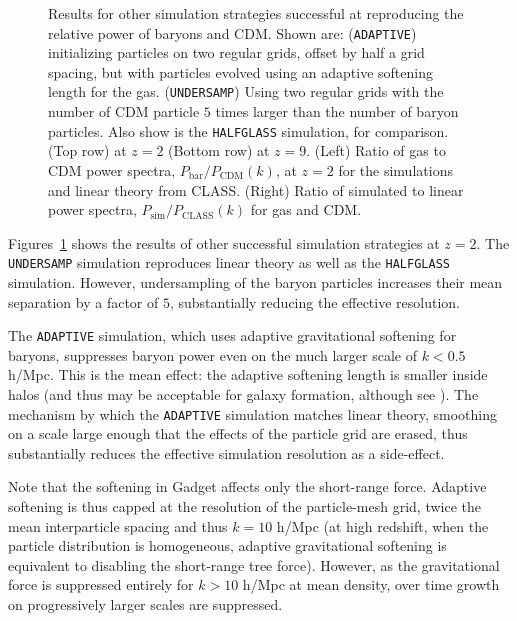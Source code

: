 \documentclass[a4paper,11pt]{article}
\begin{document}
\begin{figure}
\caption{Results for other simulation strategies successful at reproducing the relative power of baryons and CDM. Shown are: (\texttt{ADAPTIVE}) initializing particles on two regular grids, offset by half a grid spacing, but with particles evolved using an adaptive softening length for the gas. (\texttt{UNDERSAMP}) Using two regular grids with the number of CDM particle $5$ times larger than the number of baryon particles. Also show is the \texttt{HALFGLASS} simulation, for comparison. (Top row) at $z=2$ (Bottom row) at $z=9$. (Left) Ratio of gas to CDM power spectra, $P_\mathrm{bar}/P_\mathrm{CDM}(k)$, at $z=2$ for the simulations and linear theory from CLASS. (Right) Ratio of simulated to linear power spectra, $P_\mathrm{sim}/P_\mathrm{CLASS}(k)$ for gas and CDM.}
  \label{fig:adaptive}
\end{figure}

Figures~\ref{fig:adaptive} shows the results of other successful simulation strategies at $z=2$. The \texttt{UNDERSAMP} simulation reproduces linear theory as well as the \texttt{HALFGLASS} simulation. However, undersampling of the baryon particles increases their mean separation by a factor of $5$, substantially reducing the effective resolution.

The \texttt{ADAPTIVE} simulation, which uses adaptive gravitational softening for baryons, suppresses baryon power even on the much larger scale of $k < 0.5$ h/Mpc.
This is the mean effect: the adaptive softening length is smaller inside halos (and thus may be acceptable for galaxy formation, although see \cite{Fvdb:2018}). The mechanism by which the \texttt{ADAPTIVE} simulation matches linear theory, smoothing on a scale large enough that the effects of the particle grid are erased, thus substantially reduces the effective simulation resolution as a side-effect.

Note that the softening in Gadget affects only the short-range force. Adaptive softening is thus capped at the resolution of the particle-mesh grid, twice the mean interparticle spacing and thus $k = 10$ h/Mpc (at high redshift, when the particle distribution is homogeneous, adaptive gravitational softening is equivalent to disabling the short-range tree force). However, as the gravitational force is suppressed entirely for $ k > 10$ h/Mpc at mean density, over time growth on progressively larger scales are suppressed.

\end{document}
